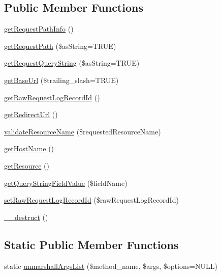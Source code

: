 \subsection*{Public Member Functions}
\begin{DoxyCompactItemize}
\item 
\hyperlink{class_able_polecat___message___request_abstract_a24f01da16b0dd5c8443a359fc63ad6a2}{get\+Request\+Path\+Info} ()
\item 
\hyperlink{class_able_polecat___message___request_abstract_a271cb279757d7442621be8d9cc655456}{get\+Request\+Path} (\$as\+String=T\+R\+U\+E)
\item 
\hyperlink{class_able_polecat___message___request_abstract_a857d46fb7d0a91198f2fdc173f65cf75}{get\+Request\+Query\+String} (\$as\+String=T\+R\+U\+E)
\item 
\hyperlink{class_able_polecat___message___request_abstract_a29afed20445af05cf3ef1c9e63a11c22}{get\+Base\+Url} (\$trailing\+\_\+slash=T\+R\+U\+E)
\item 
\hyperlink{class_able_polecat___message___request_abstract_a22300f7ad45068a4ab569ba6d1a6c605}{get\+Raw\+Request\+Log\+Record\+Id} ()
\item 
\hyperlink{class_able_polecat___message___request_abstract_a320f8cf6bf704c301b24f83e4d0c3a22}{get\+Redirect\+Url} ()
\item 
\hyperlink{class_able_polecat___message___request_abstract_a1e05d92c1527e5fbe83db15156e54457}{validate\+Resource\+Name} (\$requested\+Resource\+Name)
\item 
\hyperlink{class_able_polecat___message___request_abstract_ae78e05faf338016b4c1baeae80316a12}{get\+Host\+Name} ()
\item 
\hyperlink{class_able_polecat___message___request_abstract_a8c5a689e9be7d35d0d01d0194637a7d2}{get\+Resource} ()
\item 
\hyperlink{class_able_polecat___message___request_abstract_a1777165184f881f2a13ff0ad75c9bb20}{get\+Query\+String\+Field\+Value} (\$field\+Name)
\item 
\hyperlink{class_able_polecat___message___request_abstract_aef696836fa5e996d12af5c12882f2c01}{set\+Raw\+Request\+Log\+Record\+Id} (\$raw\+Request\+Log\+Record\+Id)
\item 
\hyperlink{class_able_polecat___message___request_abstract_a421831a265621325e1fdd19aace0c758}{\+\_\+\+\_\+destruct} ()
\end{DoxyCompactItemize}
\subsection*{Static Public Member Functions}
\begin{DoxyCompactItemize}
\item 
static \hyperlink{class_able_polecat___message___request_abstract_a94d2e558bba777f54dcc10f1bfc4dca5}{unmarshall\+Args\+List} (\$method\+\_\+name, \$args, \$options=N\+U\+L\+L)
\end{DoxyCompactItemize}
